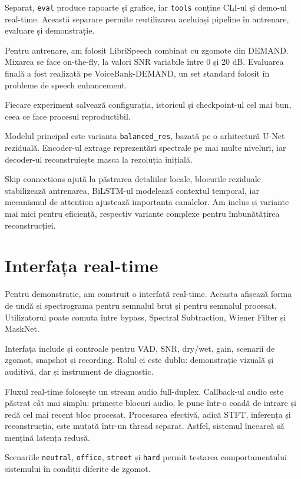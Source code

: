 \documentclass[12pt,a4paper]{article}
\begin{document}
Separat, \texttt{eval} produce rapoarte și grafice, iar \texttt{tools} conține CLI-ul și demo-ul real-time. Această separare permite reutilizarea aceluiași pipeline în antrenare, evaluare și demonstrație.

Pentru antrenare, am folosit LibriSpeech combinat cu zgomote din DEMAND. Mixarea se face on-the-fly, la valori SNR variabile între 0 și 20 dB. Evaluarea finală a fost realizată pe VoiceBank-DEMAND, un set standard folosit în probleme de speech enhancement.

Fiecare experiment salvează configurația, istoricul și checkpoint-ul cel mai bun, ceea ce face procesul reproductibil.

Modelul principal este varianta \texttt{balanced\_res}, bazată pe o arhitectură U-Net reziduală. Encoder-ul extrage reprezentări spectrale pe mai multe niveluri, iar decoder-ul reconstruiește masca la rezoluția inițială.

Skip connections ajută la păstrarea detaliilor locale, blocurile reziduale stabilizează antrenarea, BiLSTM-ul modelează contextul temporal, iar mecanismul de attention ajustează importanța canalelor. Am inclus și variante mai mici pentru eficiență, respectiv variante complexe pentru îmbunătățirea reconstrucției.

\section*{Interfața real-time}

Pentru demonstrație, am construit o interfață real-time. Aceasta afișează forma de undă și spectrograma pentru semnalul brut și pentru semnalul procesat. Utilizatorul poate comuta între bypass, Spectral Subtraction, Wiener Filter și MaskNet.

Interfața include și controale pentru VAD, SNR, dry/wet, gain, scenarii de zgomot, snapshot și recording. Rolul ei este dublu: demonstrație vizuală și auditivă, dar și instrument de diagnostic.

Fluxul real-time folosește un stream audio full-duplex. Callback-ul audio este păstrat cât mai simplu: primește blocuri audio, le pune într-o coadă de intrare și redă cel mai recent bloc procesat. Procesarea efectivă, adică STFT, inferența și reconstrucția, este mutată într-un thread separat. Astfel, sistemul încearcă să mențină latența redusă.

Scenariile \texttt{neutral}, \texttt{office}, \texttt{street} și \texttt{hard} permit testarea comportamentului sistemului în condiții diferite de zgomot.
\end{document}
